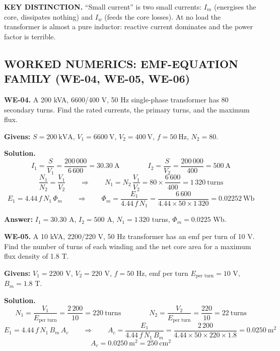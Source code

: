 \documentclass[11pt]{article}
\newcommand{\tagline}[1]{\textbf{\color{copper}#1}}
\newcommand{\keydist}[1]{\vspace{2pt}\textbf{\color{red}KEY DISTINCTION.} #1}
\begin{document}
\keydist{``Small current'' is two small currents: $I_m$ (energises the core, dissipates nothing) and $I_w$ (feeds the core losses). At no load the transformer is almost a pure inductor: reactive current dominates and the power factor is terrible.}

\hrulefill
\subsection*{\color{copper}WORKED NUMERICS: EMF-EQUATION FAMILY (WE-04, WE-05, WE-06)}

\tagline{WE-04.} A 200 kVA, 6600/400 V, 50 Hz single-phase transformer has 80 secondary turns. Find the rated currents, the primary turns, and the maximum flux.

\textbf{Givens:} $S = 200\ \text{kVA}$, $V_1 = 6600\ \text{V}$, $V_2 = 400\ \text{V}$, $f = 50\ \text{Hz}$, $N_2 = 80$.

\textbf{Solution.}
\[
I_1 = \frac{S}{V_1} = \frac{200\,000}{6\,600} = 30.30\ \text{A}
\qquad\qquad
I_2 = \frac{S}{V_2} = \frac{200\,000}{400} = 500\ \text{A}
\]
\[
\frac{N_1}{N_2} = \frac{V_1}{V_2}
\qquad\Longrightarrow\qquad
N_1 = N_2\,\frac{V_1}{V_2} = 80 \times \frac{6\,600}{400} = 1\,320\ \text{turns}
\]
\[
E_1 = 4.44\,f\,N_1\,\Phi_m
\qquad\Longrightarrow\qquad
\Phi_m = \frac{E_1}{4.44\,f\,N_1} = \frac{6\,600}{4.44 \times 50 \times 1\,320} = 0.02252\ \text{Wb}
\]

\textbf{Answer:} $I_1 = 30.30$ A, $I_2 = 500$ A, $N_1 = 1\,320$ turns, $\Phi_m = 0.0225$ Wb.

\vspace{2pt}

\tagline{WE-05.} A 10 kVA, 2200/220 V, 50 Hz transformer has an emf per turn of 10 V. Find the number of turns of each winding and the net core area for a maximum flux density of 1.8 T.

\textbf{Givens:} $V_1 = 2200$ V, $V_2 = 220$ V, $f = 50$ Hz, emf per turn $E_{\text{per turn}} = 10$ V, $B_m = 1.8$ T.

\textbf{Solution.}
\[
N_1 = \frac{V_1}{E_{\text{per turn}}} = \frac{2\,200}{10} = 220\ \text{turns}
\qquad\qquad
N_2 = \frac{V_2}{E_{\text{per turn}}} = \frac{220}{10} = 22\ \text{turns}
\]
\[
E_1 = 4.44\,f\,N_1\,B_m\,A_c
\qquad\Longrightarrow\qquad
A_c = \frac{E_1}{4.44\,f\,N_1\,B_m} = \frac{2\,200}{4.44 \times 50 \times 220 \times 1.8} = 0.0250\ \text{m}^2
\]
\[
A_c = 0.0250\ \text{m}^2 = 250\ \text{cm}^2
\]
\end{document}
